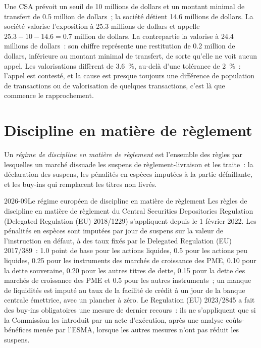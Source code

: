 \begin{example}\label{ex:fm:operations:call}
Une CSA prévoit un seuil de 10 millions de dollars et un montant minimal de transfert de 0.5 million de dollars~; la société détient 14.6 millions de dollars. La société valorise
l'exposition à 25.3 millions de dollars et appelle $25.3-10-14.6=0.7$ million de dollars. La contrepartie la valorise à 24.4 millions de dollars~: son chiffre représente une restitution de 0.2 million de dollars,
inférieure au montant minimal de transfert, de sorte qu'elle ne voit aucun appel. Les valorisations diffèrent de 3.6~\%, au-delà d'une tolérance de 2~\%~: l'appel est contesté, et la cause
est presque toujours une différence de population de transactions ou de valorisation de quelques transactions, c'est là que commence le rapprochement.
\end{example}

\label{lst:fm:operations:csa}

\section{Discipline en matière de règlement}

\begin{definition}\label{def:fm:operations:discipline}
Un \emph{régime de discipline en matière de règlement} est l'ensemble des règles par lesquelles un marché dissuade les suspens de règlement-livraison et les traite~:
la déclaration des suspens, les pénalités en espèces imputées à la partie défaillante, et les buy-ins qui remplacent les titres non livrés.
\end{definition}

\begin{dated}{2026-09}{Le régime européen de discipline en matière de règlement}\label{dat:fm:operations:csdr}
Les règles de discipline en matière de règlement du Central Securities Depositories Regulation (Delegated Regulation (EU) 2018/1229) s'appliquent depuis le 1 février
2022. Les pénalités en espèces sont imputées par jour de suspens sur la valeur de l'instruction en défaut, à des taux fixés par le Delegated Regulation (EU) 2017/389~: 1.0
point de base pour les actions liquides, 0.5 pour les actions peu liquides, 0.25 pour les instruments des marchés de croissance des PME, 0.10 pour la dette souveraine, 0.20 pour les autres titres de dette,
0.15 pour la dette des marchés de croissance des PME et 0.5 pour les autres instruments~; un manque de liquidités est imputé au taux de la facilité de crédit à un jour de la banque centrale émettrice,
avec un plancher à zéro. Le Regulation (EU) 2023/2845 a fait des buy-ins obligatoires une mesure de dernier recours~: ils ne s'appliquent que si la Commission les introduit par
un acte d'exécution, après une analyse coûts-bénéfices menée par l'ESMA, lorsque les autres mesures n'ont pas réduit les suspens.
\end{dated}

